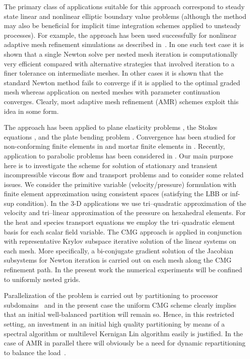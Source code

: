 The primary class of applications suitable for this approach
correspond to steady state linear and nonlinear elliptic boundary
value problems (although the method may also be beneficial for implicit
time integration schemes applied to unsteady processes).  For example, the
approach has been used successfully
for nonlinear adaptive mesh refinement simulations as described  in~\cite{carey_gridbook}.
In one such test case it is shown that a single Newton solve per nested mesh
iteration is computationally very  efficient compared with alternative
strategies that involved iteration to a finer tolerance on intermediate
meshes.  In other cases it is
shown that the standard Newton method fails to converge if it is
applied to the optimal graded mesh whereas application on nested
meshes with parameter continuation converges.  Clearly, most adaptive
mesh refinement (AMR) schemes exploit this idea in some form.

The approach has been applied to  plane elasticity problems \cite{ShaGil96}, the Stokes equations \cite{BraDah99}, and the plate bending problem \cite{ShiXu98}. Convergence has been studied for non-conforming finite elements in \cite{Ste98} and mortar finite elements in \cite{braess-2002-subspace}. Recently,  application to parabolic problems has been considered in \cite{ShiXu99}. Our main purpose here is to investigate the scheme for
solution of stationary and transient incompressible viscous flow and
transport problems and to consider some related issues.  We
consider the primitive variable (velocity/pressure) formulation with
finite element approximation using consistent spaces (satisfying the
LBB or inf-sup condition).  In the 3-D applications we use
tri--quadratic approximation of the velocity and tri--linear
approximation of the pressure on hexahedral elements.  For the heat
and species transport equations we employ the tri--quadratic element basis
for each scalar field variable. The CMG approach is applied in
conjunction with representative Krylov subspace iterative solution of
the linear systems on each mesh. More specifically, a bi-conjugate gradient solution of
the Jacobian subsystems for Newton iteration is carried out on each
mesh along the CMG refinement path.  In the present work the
numerical experiments will be confined to uniformly nested grids.

Parallelization of the problem is carried out by partitioning
to processor subdomains~\cite{carey_world_scientific_2000} and in the present case the uniform
CMG scheme clearly implies that an initial well-balanced partition
will remain so.  Hence, in this restricted setting, an investment in an
initial high quality partitioning by means of a spectral algorithm or
multilevel Kernigan Lin  algorithm easily is justified.  In the case of AMR in parallel
 there will obviously be a need for dynamic
repartitioning to balance the load~\cite{ZoltanOverviewArticle}.

